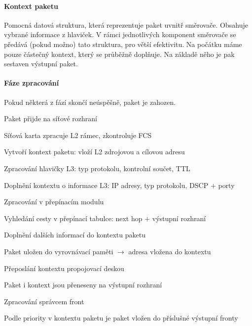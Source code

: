 \paragraph*{Kontext paketu} Pomocná datová struktura, která reprezentuje paket uvnitř směrovače. Obsahuje vybrané informace z hlaviček. V rámci jednotlivých komponent směrovače se předává (pokud možno) tato struktura, pro větší efektivitu. Na počátku máme pouze částečný kontext, který se průběžně doplňuje. Na základě něho je pak sestaven výstupní paket.

\paragraph*{Fáze zpracování} Pokud některá z fází skončí neúspěšně, paket je zahozen. \begin{compactenum}
    \item Paket přijde na síťové rozhraní \begin{compactitem}
        \item Síťová karta zpracuje L2 rámec, zkontroluje FCS
        \item Vytvoří kontext paketu: vloží L2 zdrojovou a cílovou adresu
        \item Zpracování hlavičky L3: typ protokolu, kontrolní součet, TTL
        \item Doplnění kontextu o informace L3: IP adresy, typ protokolu, DSCP $+$ porty
    \end{compactitem}
    \item Zpracování v přepínacím modulu \begin{compactitem}
        \item Vyhledání cesty v přepínací tabulce: next hop $+$ výstupní rozhraní
        \item Doplnění dalších informací do kontextu paketu
        \item Paket uložen do vyrovnávací paměti $\rightarrow$ adresa vložena do kontextu
    \end{compactitem}
    \item Přeposlání kontextu propojovací deskou \begin{compactitem}
        \item Paket i kontext jsou přeneseny na výstupní rozhraní
    \end{compactitem}
    \item Zpracování správcem front \begin{compactitem}
        \item Podle priority v kontextu paketu je paket vložen do příslušné výstupní fronty

\end{compactitem}
\end{compactenum}

